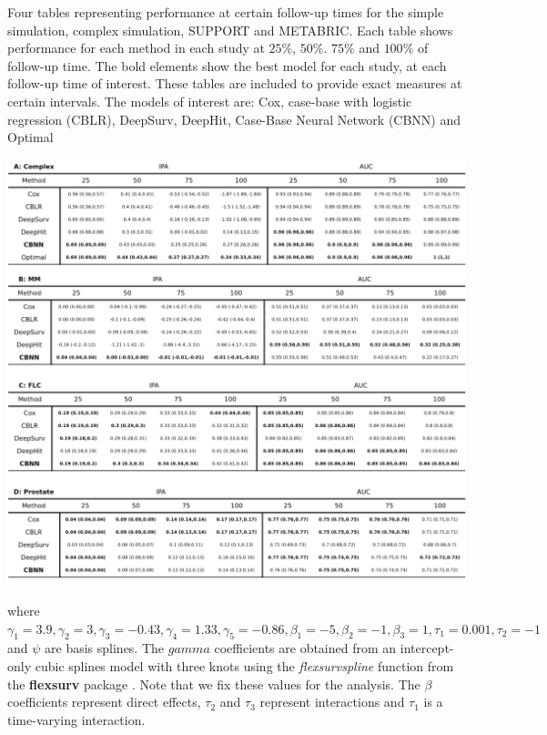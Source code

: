 \documentclass[APA,LATO1COL]{WileyNJD-v2}
\begin{document}
\begin{table}
\caption{Four tables representing performance at certain follow-up times for the simple simulation, complex simulation, SUPPORT and METABRIC. Each table shows performance for each method in each study at $25\%$, $50\%$. $75\%$ and $100\%$ of follow-up time. The bold elements show the best model for each study, at each follow-up time of interest. These tables are included to provide exact measures at certain intervals. The models of interest are: Cox, case-base with logistic regression (CBLR), DeepSurv, DeepHit, Case-Base Neural Network (CBNN) and Optimal}
\label{tab:megaTable}

\begin{center}\includegraphics[width=1\linewidth]{../../../analyses/figures/megaTable} \end{center}

\end{table}


where
\(\gamma_{1}=3.9, \gamma_{2}=3, \gamma_{3}=-0.43, \gamma_{4}=1.33,\gamma_{5}=-0.86, \beta_{{1}}=-5, \beta_{{2}}=-1, \beta_{{3}}=1, \tau_{1}=0.001, \tau_{2}=-1\)
and \(\psi\) are basis splines. The \(gamma\) coefficients are obtained
from an intercept-only cubic splines model with three knots using the
\emph{flexsurvspline} function from the \textbf{flexsurv} package
\citep{flexsurv}. Note that we fix these values for the analysis. The
\(\beta\) coefficients represent direct effects, \(\tau_{2}\) and
\({\tau_3}\) represent interactions and \(\tau_{1}\) is a time-varying
interaction.
\end{document}
